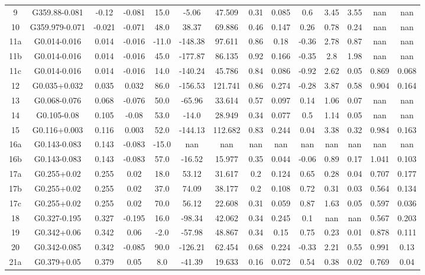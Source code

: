 \begin{table}
\begin{tabular}{cccccccccccccc}
9 & G359.88-0.081 & -0.12 & -0.081 & 15.0 & -5.06 & 47.509 & 0.31 & 0.085 & 0.6 & 3.45 & 3.55 & nan & nan \\
10 & G359.979-0.071 & -0.021 & -0.071 & 48.0 & 38.37 & 69.886 & 0.46 & 0.147 & 0.26 & 0.78 & 0.24 & nan & nan \\
11a & G0.014-0.016 & 0.014 & -0.016 & -11.0 & -148.38 & 97.611 & 0.86 & 0.18 & -0.36 & 2.78 & 0.87 & nan & nan \\
11b & G0.014-0.016 & 0.014 & -0.016 & 45.0 & -177.87 & 86.135 & 0.92 & 0.166 & -0.35 & 2.8 & 1.98 & nan & nan \\
11c & G0.014-0.016 & 0.014 & -0.016 & 14.0 & -140.24 & 45.786 & 0.84 & 0.086 & -0.92 & 2.62 & 0.05 & 0.869 & 0.068 \\
12 & G0.035+0.032 & 0.035 & 0.032 & 86.0 & -156.53 & 121.741 & 0.86 & 0.274 & -0.28 & 3.87 & 0.58 & 0.904 & 0.164 \\
13 & G0.068-0.076 & 0.068 & -0.076 & 50.0 & -65.96 & 33.614 & 0.57 & 0.097 & 0.14 & 1.06 & 0.07 & nan & nan \\
14 & G0.105-0.08 & 0.105 & -0.08 & 53.0 & -14.0 & 28.949 & 0.34 & 0.077 & 0.5 & 1.14 & 0.05 & nan & nan \\
15 & G0.116+0.003 & 0.116 & 0.003 & 52.0 & -144.13 & 112.682 & 0.83 & 0.244 & 0.04 & 3.38 & 0.32 & 0.984 & 0.163 \\
16a & G0.143-0.083 & 0.143 & -0.083 & -15.0 & nan & nan & nan & nan & nan & nan & nan & nan & nan \\
16b & G0.143-0.083 & 0.143 & -0.083 & 57.0 & -16.52 & 15.977 & 0.35 & 0.044 & -0.06 & 0.89 & 0.17 & 1.041 & 0.103 \\
17a & G0.255+0.02 & 0.255 & 0.02 & 18.0 & 53.12 & 31.617 & 0.2 & 0.124 & 0.65 & 0.28 & 0.04 & 0.707 & 0.177 \\
17b & G0.255+0.02 & 0.255 & 0.02 & 37.0 & 74.09 & 38.177 & 0.2 & 0.108 & 0.72 & 0.31 & 0.03 & 0.564 & 0.134 \\
17c & G0.255+0.02 & 0.255 & 0.02 & 70.0 & 56.12 & 22.608 & 0.31 & 0.059 & 0.87 & 1.63 & 0.05 & 0.597 & 0.036 \\
18 & G0.327-0.195 & 0.327 & -0.195 & 16.0 & -98.34 & 42.062 & 0.34 & 0.245 & 0.1 & nan & nan & 0.567 & 0.203 \\
19 & G0.342+0.06 & 0.342 & 0.06 & -2.0 & -57.98 & 48.867 & 0.34 & 0.15 & 0.75 & 0.23 & 0.01 & 0.878 & 0.111 \\
20 & G0.342-0.085 & 0.342 & -0.085 & 90.0 & -126.21 & 62.454 & 0.68 & 0.224 & -0.33 & 2.21 & 0.55 & 0.991 & 0.13 \\
21a & G0.379+0.05 & 0.379 & 0.05 & 8.0 & -41.39 & 19.633 & 0.16 & 0.072 & 0.54 & 0.38 & 0.02 & 0.769 & 0.04 \\

\end{tabular}
\end{table}
